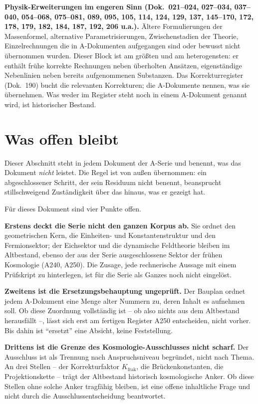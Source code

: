 \textbf{Physik-Erweiterungen im engeren Sinn (Dok.~021--024, 027--034,
037--040, 054--068, 075--081, 089, 095, 105, 114, 124, 129, 137, 145--170,
172, 178, 179, 182, 184, 187, 192, 206 u.a.).} Ältere Formulierungen der Massenformel,
alternative Parametrisierungen, Zwischenstadien der Theorie, Einzelrechnungen die
in A-Dokumenten aufgegangen sind oder bewusst nicht übernommen wurden. Dieser
Block ist am größten und am heterogensten: er enthält frühe korrekte Rechnungen
neben überholten Ansätzen, eigenständige Nebenlinien neben bereits aufgenommenen
Substanzen. Das Korrekturregister (Dok.~190) bucht die relevanten Korrekturen;
die A-Dokumente nennen, was sie übernehmen. Was weder im Register steht noch
in einem A-Dokument genannt wird, ist historischer Bestand.


\section{Was offen bleibt}

Dieser Abschnitt steht in jedem Dokument der A-Serie und benennt, was das
Dokument \emph{nicht} leistet. Die Regel ist von außen übernommen: ein
abgeschlossener Schritt, der sein Residuum nicht benennt, beansprucht
stillschweigend Zuständigkeit über das hinaus, was er gezeigt hat.

Für dieses Dokument sind vier Punkte offen.

\textbf{Erstens deckt die Serie nicht den ganzen Korpus ab.} Sie ordnet den
geometrischen Kern, die Einheiten- und Konstantenstruktur und den Fermionsektor;
der Eichsektor und die dynamische Feldtheorie bleiben im Altbestand, ebenso der
aus der Serie ausgeschlossene Sektor der frühen Kosmologie (A240, A250). Die Zusage, jede rechnerische Aussage mit einem
Prüfskript zu
hinterlegen, ist für die Serie als Ganzes noch nicht eingelöst.

\textbf{Zweitens ist die Ersetzungsbehauptung ungeprüft.} Der Bauplan ordnet
jedem A-Dokument eine Menge alter Nummern zu, deren Inhalt es aufnehmen soll.
Ob diese Zuordnung vollständig ist -- ob also nichts aus dem Altbestand
herausfällt --, lässt sich erst am fertigen Register A250 entscheiden, nicht
vorher. Bis dahin ist \enquote{ersetzt} eine Absicht, keine Feststellung.

\textbf{Drittens ist die Grenze des Kosmologie-Ausschlusses nicht scharf.} Der
Ausschluss ist als Trennung nach Anspruchsniveau begründet, nicht nach Thema.
An drei Stellen -- der Korrekturfaktor $K_\text{frak}$, die Brückenkonstanten,
die Projektionskette -- trägt der Altbestand historisch kosmologische Anker.
Ob diese Stellen ohne solche Anker tragfähig bleiben, ist eine offene
inhaltliche Frage und nicht durch die Ausschlussentscheidung beantwortet.

